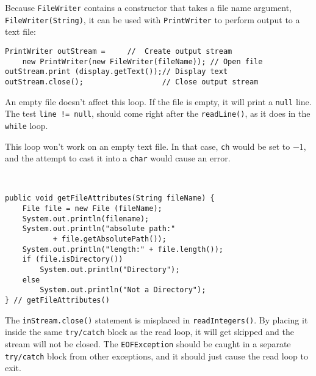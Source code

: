 \secANSHleft
\begin{ANS}
\item 
Because {\tt FileWriter} contains a constructor that takes a file name
argument, {\tt FileWriter(String)}, it can be used with
{\tt Print\-Writer} to perform output to a text file:

\begin{jjjlisting}
\begin{lstlisting}
PrintWriter outStream =     //  Create output stream
    new PrintWriter(new FileWriter(fileName)); // Open file
outStream.print (display.getText());// Display text
outStream.close();                  // Close output stream
\end{lstlisting}
\end{jjjlisting}

\item An empty file doesn't affect this loop.  If the file is empty,
it will print a {\tt null} line.  The test {\tt line != null}, should
come right after the {\tt readLine()}, as it does in the {\tt while}
loop.


\item  This loop won't work on an empty text file.  In that case, {\tt ch}
would be set to $-1$, and the attempt to cast it into a {\tt char}
would cause an error.

\item  \mbox{ }
\begin{jjjlisting}
\begin{lstlisting}
public void getFileAttributes(String fileName) {
    File file = new File (fileName);
    System.out.println(filename);
    System.out.println("absolute path:" 
           + file.getAbsolutePath());
    System.out.println("length:" + file.length());
    if (file.isDirectory())
        System.out.println("Directory");
    else
        System.out.println("Not a Directory");
} // getFileAttributes()
\end{lstlisting}
\end{jjjlisting}

\item  The {\tt inStream.close()} statement is misplaced in {\tt read\-Integers()}.
By placing it inside the same {\tt try/catch} block as the read loop,
it will get skipped and the stream will not be closed.  The {\tt EOFException}
should be caught in a separate {\tt try/catch} block from other
exceptions, and it should just cause the read loop to exit.


\end{ANS}
